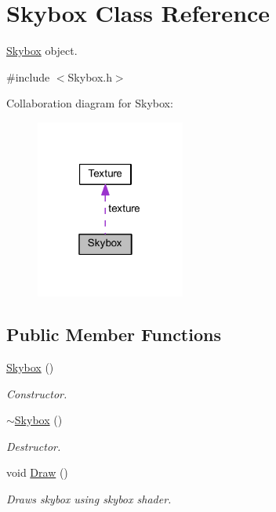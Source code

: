 \hypertarget{class_skybox}{}\section{Skybox Class Reference}
\label{class_skybox}


\mbox{\hyperlink{class_skybox}{Skybox}} object.  




{\ttfamily \#include $<$Skybox.\+h$>$}



Collaboration diagram for Skybox\+:
\nopagebreak
\begin{figure}[H]
\begin{center}
\leavevmode
\includegraphics[width=139pt]{class_skybox__coll__graph}
\end{center}
\end{figure}
\subsection*{Public Member Functions}
\begin{DoxyCompactItemize}
\item 
\mbox{\hyperlink{class_skybox_a77a92db4492ed94ed4bd101b05ffb1f4}{Skybox}} ()
\begin{DoxyCompactList}\small\item\em Constructor. \end{DoxyCompactList}\item 
\mbox{\hyperlink{class_skybox_a62ad4c6b4b1965a0a6d8536a50d4c090}{$\sim$\+Skybox}} ()
\begin{DoxyCompactList}\small\item\em Destructor. \end{DoxyCompactList}\item 
void \mbox{\hyperlink{class_skybox_a8bf85652e4f0559530eb7a1f5ed87439}{Draw}} ()
\begin{DoxyCompactList}\small\item\em Draws skybox using skybox shader. \end{DoxyCompactList}\end{DoxyCompactItemize}
